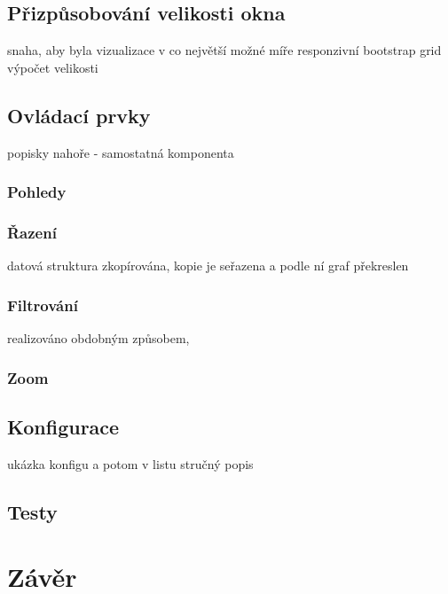 \documentclass[
  digital, %
  oneside, %
  table,   %
  nolof,     %
  nolot,     %
]{fithesis3}
\begin{document}
\section{Přizpůsobování velikosti okna}
snaha, aby byla vizualizace v co největší možné míře responzivní
bootstrap grid
výpočet velikosti

\section{Ovládací prvky}
popisky nahoře - samostatná komponenta
\subsection{Pohledy}
\subsection{Řazení}
datová struktura zkopírována, kopie je seřazena a podle ní graf překreslen
\subsection{Filtrování}
realizováno obdobným způsobem, 
\subsection{Zoom}

\section{Konfigurace}
ukázka konfigu a potom v listu stručný popis

\section{Testy}

\chapter{Závěr}

\printbibliography
\end{document}
